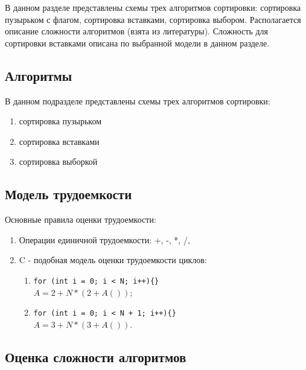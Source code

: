 В данном разделе представлены схемы трех алгоритмов сортировки: сортировка пузырьком с флагом, сортировка вставками, сортировка выбором. Располагается описание сложности алгоритмов (взята из литературы). Сложность для сортировки вставками описана по выбранной модели в данном разделе.

\subsection{Алгоритмы}

	В данном подразделе представлены схемы трех алгоритмов сортировки:
	\begin{enumerate}[1)]
		\item сортировка пузырьком
		\item сортировка вставками
		\item сортировка выборкой
	\end{enumerate}

	

\subsection{Модель трудоемкости}
	
	Основные правила оценки трудоемкости:
	\begin{enumerate}
		\item Операции единичной трудоемкости: +, -, *, /, %
		\item C - подобная модель оценки трудоемкости циклов:
		\begin{enumerate}
			\item 
			\lstinline|for (int i = 0; i < N; i++){}| \\
			$ A = 2 + N * (2 + A()) $;
			\item
			\lstinline|for (int i = 0; i < N + 1; i++){}| \\
			$ A = 3 + N * (3 + A()) $.
			
		\end{enumerate}
	\end{enumerate}

\subsection{Оценка сложности алгоритмов}
	
